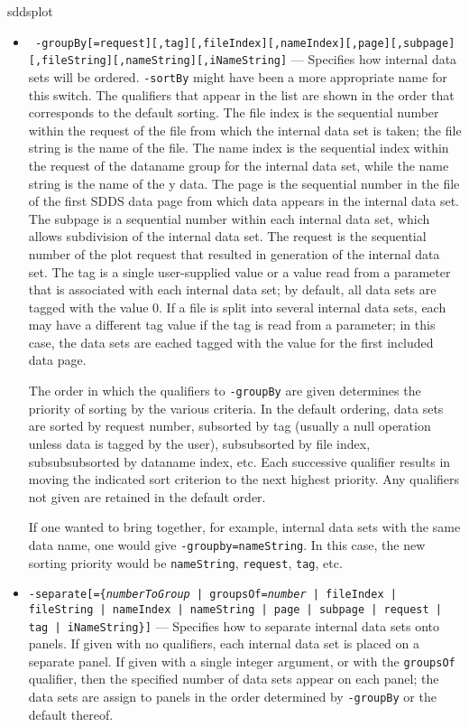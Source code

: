\begin{sddsprog}{sddsplot}
\begin{itemize}
\begin{itemize}
  \item {\tt
 -groupBy[=request][,tag][,fileIndex][,nameIndex][,page][,subpage]} {\tt [,fileString][,nameString][,iNameString]} ---
 Specifies how internal data sets will be ordered.  {\tt -sortBy} might have been a more appropriate
 name for this switch.  The qualifiers that appear in the list are shown in the order that
 corresponds to the default sorting.  The file index is the sequential number within the request of
 the file from which the internal data set is taken; the file string is the name of the file.  The
 name index is the sequential index within the request of the dataname group for the internal data
 set, while the name string is the name of the y data.  The page is the sequential number in the file
 of the first SDDS data page from which data appears in the internal data set.  The subpage is a
 sequential number within each internal data set, which allows subdivision of the internal data set.
 The request is the sequential number of the plot request that resulted in generation of the internal
 data set.  The tag is a single user-supplied value or a value read from a parameter that is
 associated with each internal data set; by default, all data sets are tagged with the value 0.  If a
 file is split into several internal data sets, each may have a different tag value if the tag is
 read from a parameter; in this case, the data sets are eached tagged with the value for the first
 included data page.

The order in which the qualifiers to {\tt -groupBy} are given determines the priority of sorting by
the various criteria.  In the default ordering, data sets are sorted by request number, subsorted by
tag (usually a null operation unless data is tagged by the user), subsubsorted by file index,
subsubsubsorted by dataname index, etc.  Each successive qualifier results in moving the indicated
sort criterion to the next highest priority.  Any qualifiers not given are retained in the default
order.

If one wanted to bring together, for example, internal data sets with the same data name, one would
give {\tt -groupby=nameString}.  In this case, the new sorting priority would be {\tt nameString},
{\tt request}, {\tt tag}, etc.

  \item {\tt -separate[=\{{\em numberToGroup} | groupsOf={\em number} | fileIndex | fileString |
nameIndex | nameString | page | subpage | request | tag | iNameString\}]} --- Specifies how to separate internal data
sets onto panels.  If given with no qualifiers, each internal data set is placed on a separate panel.
If given with a single integer argument, or with the {\tt groupsOf} qualifier, then the specified
number of data sets appear on each panel; the data sets are assign to panels in the order determined
by {\tt -groupBy} or the default thereof.


\end{itemize}
\end{itemize}
\end{sddsprog}
